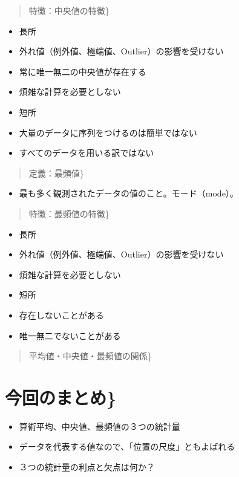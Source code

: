\documentclass[
]{book}
\providecommand{\tightlist}{%
  \setlength{\itemsep}{0pt}\setlength{\parskip}{0pt}}
\theoremstyle{definition}
\theoremstyle{definition}
\theoremstyle{definition}
\theoremstyle{definition}
\theoremstyle{remark}
\begin{document}
\begin{quote}
特徴：中央値の特徴\}
\end{quote}

\begin{itemize}
\item
  長所
\item
  外れ値（例外値、極端値、Outlier）の影響を受けない
\item
  常に唯一無二の中央値が存在する
\item
  煩雑な計算を必要としない
\item
  短所
\item
  大量のデータに序列をつけるのは簡単ではない
\item
  すべてのデータを用いる訳ではない
\end{itemize}

\begin{quote}
定義：最頻値\}
\end{quote}

\begin{itemize}
\tightlist
\item
  最も多く観測されたデータの値のこと。モード（mode）。
\end{itemize}

\begin{quote}
特徴：最頻値の特徴\}
\end{quote}

\begin{itemize}
\item
  長所
\item
  外れ値（例外値、極端値、Outlier）の影響を受けない
\item
  煩雑な計算を必要としない
\item
  短所
\item
  存在しないことがある
\item
  唯一無二でないことがある
\end{itemize}

\begin{quote}
平均値・中央値・最頻値の関係\}
\end{quote}

\hypertarget{ux4ecaux56deux306eux307eux3068ux3081}{%
\section{今回のまとめ\}}\label{ux4ecaux56deux306eux307eux3068ux3081}}

\begin{itemize}
\item
  算術平均、中央値、最頻値の３つの統計量
\item
  データを代表する値なので、「位置の尺度」ともよばれる
\item
  ３つの統計量の利点と欠点は何か？
\end{itemize}
\end{document}
